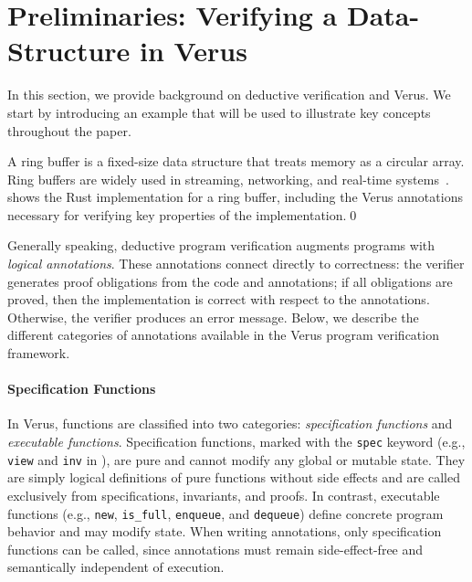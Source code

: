 \section{Preliminaries: Verifying a Data-Structure in Verus}
\label{sec:background}

In this section, we provide background on deductive verification and Verus.  We start by introducing an example that will be used to illustrate key concepts throughout the paper.

\begin{example}
\label{ex:rb}
A ring buffer is a fixed-size data structure that treats memory as a circular array.  Ring buffers are widely used in streaming, networking, and real-time systems~\cite{tock,knuth1997art}.  shows the Rust implementation for a ring buffer, including the Verus annotations necessary for verifying key properties of the implementation.\qed    
\end{example}

Generally speaking, deductive program verification augments programs with \emph{logical annotations}.  %
These annotations connect directly to correctness: the verifier generates proof obligations from the code and annotations; if all obligations are proved, then the implementation is correct with respect to the annotations. Otherwise, the verifier produces an error message. Below, we describe the different categories of annotations available in the Verus program verification framework.

\paragraph{Specification Functions}
In Verus, functions are classified into two categories: \emph{specification functions} and \emph{executable functions}. Specification functions, marked with the \texttt{spec} keyword (e.g., \texttt{view} and \texttt{inv} in ), are pure and cannot modify any global or mutable state. They are simply logical definitions of pure functions without side effects and are called exclusively from specifications, invariants, and proofs. In contrast, executable functions (e.g., \texttt{new}, \texttt{is\_full}, \texttt{enqueue}, and \texttt{dequeue}) define concrete program behavior and may modify state. When writing annotations, only specification functions can be called, since annotations must remain side-effect-free and semantically independent of execution.

